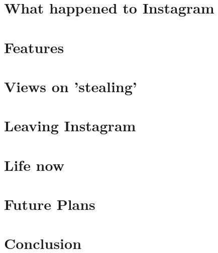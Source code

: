 \documentclass{article}
\begin{document}
    \section{What happened to Instagram}
    \section{Features}
    \section{Views on 'stealing'}
    \section{Leaving Instagram}
    \section{Life now}
    \section{Future Plans}

    \section{Conclusion}
\end{document}
